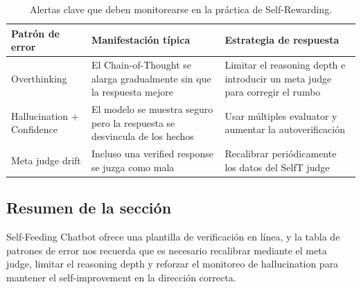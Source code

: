 \begin{table}[H]
\centering
\begin{tabular}{p{4cm}p{5cm}p{5cm}}
\toprule
Patrón de error & Manifestación típica & Estrategia de respuesta \\
\midrule
Overthinking & El Chain-of-Thought se alarga gradualmente sin que la respuesta mejore & Limitar el reasoning depth e introducir un meta judge para corregir el rumbo \\
Hallucination + Confidence & El modelo se muestra seguro pero la respuesta se desvincula de los hechos & Usar múltiples evaluator y aumentar la autoverificación \\
Meta judge drift & Incluso una verified response se juzga como mala & Recalibrar periódicamente los datos del SelfT judge \\
\bottomrule
\end{tabular}
\caption{Alertas clave que deben monitorearse en la práctica de Self-Rewarding.}
\end{table}

\subsection{Resumen de la sección}
Self-Feeding Chatbot ofrece una plantilla de verificación en línea, y la tabla de patrones de error nos recuerda que es necesario recalibrar mediante el meta judge, limitar el reasoning depth y reforzar el monitoreo de hallucination para mantener el self-improvement en la dirección correcta.

